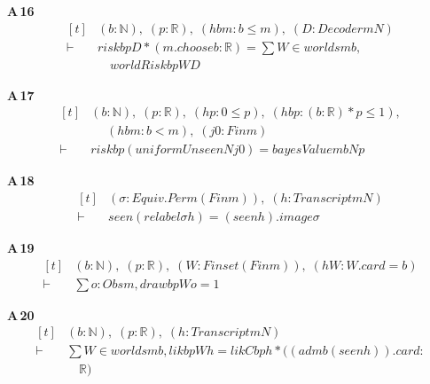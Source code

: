\noindent\textbf{A\,16}\quad{}
{\footnotesize\[ \begin{aligned}[t]
&(\mathit{b} : \mathbb{N} ),\; (\mathit{p} : \mathbb{R} ),\; (\mathit{hbm} : \mathit{b} \leq \mathit{m}),\; (\mathit{D} : \mathit{Decoder} \mathit{m} \mathit{N})\\
\vdash\;&\mathit{risk} \mathit{b} \mathit{p} \mathit{D} * (\mathit{m}.\mathit{choose} \mathit{b} : \mathbb{R} ) = \textstyle\sum \mathit{W} \in \mathit{worlds} \mathit{m} \mathit{b},\\
&\quad \mathit{worldRisk} \mathit{b} \mathit{p} \mathit{W} \mathit{D}
\end{aligned} \]}

\noindent\textbf{A\,17}\quad{}
{\footnotesize\[ \begin{aligned}[t]
&(\mathit{b} : \mathbb{N} ),\; (\mathit{p} : \mathbb{R} ),\; (\mathit{hp} : 0 \leq \mathit{p}),\; (\mathit{hbp} : (\mathit{b} : \mathbb{R} ) * \mathit{p} \leq 1),\\
&\quad \; (\mathit{hbm} : \mathit{b} < \mathit{m}),\; (\mathit{j0} : \mathit{Fin} \mathit{m})\\
\vdash\;&\mathit{risk} \mathit{b} \mathit{p} (\mathit{uniformUnseen} \mathit{N} \mathit{j0}) = \mathit{bayesValue} \mathit{m} \mathit{b} \mathit{N} \mathit{p}
\end{aligned} \]}

\noindent\textbf{A\,18}\quad{}
{\footnotesize\[ \begin{aligned}[t]
&(\sigma : \mathit{Equiv}.\mathit{Perm} (\mathit{Fin} \mathit{m})),\; (\mathit{h} : \mathit{Transcript} \mathit{m} \mathit{N})\\
\vdash\;&\mathit{seen} (\mathit{relabel} \sigma \mathit{h}) = (\mathit{seen} \mathit{h}).\mathit{image} \sigma
\end{aligned} \]}

\noindent\textbf{A\,19}\quad{}
{\footnotesize\[ \begin{aligned}[t]
&(\mathit{b} : \mathbb{N} ),\; (\mathit{p} : \mathbb{R} ),\; (\mathit{W} : \mathit{Finset} (\mathit{Fin} \mathit{m})),\; (\mathit{hW} : \mathit{W}.\mathit{card} = \mathit{b})\\
\vdash\;&\textstyle\sum \mathit{o} : \mathit{Obs} \mathit{m}, \mathit{draw} \mathit{b} \mathit{p} \mathit{W} \mathit{o} = 1
\end{aligned} \]}

\noindent\textbf{A\,20}\quad{}
{\footnotesize\[ \begin{aligned}[t]
&(\mathit{b} : \mathbb{N} ),\; (\mathit{p} : \mathbb{R} ),\; (\mathit{h} : \mathit{Transcript} \mathit{m} \mathit{N})\\
\vdash\;&\textstyle\sum \mathit{W} \in \mathit{worlds} \mathit{m} \mathit{b}, \mathit{lik} \mathit{b} \mathit{p} \mathit{W} \mathit{h} = \mathit{likC} \mathit{b} \mathit{p} \mathit{h} * ((\mathit{adm} \mathit{b} (\mathit{seen} \mathit{h})).\mathit{card} :\\
&\quad \mathbb{R} )
\end{aligned} \]}

